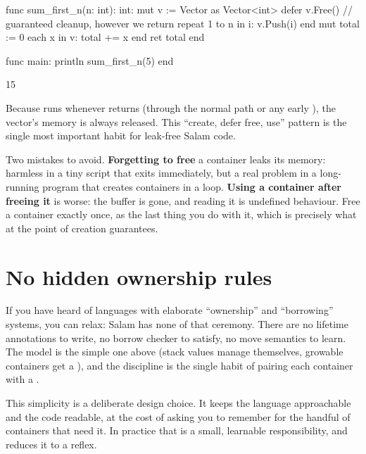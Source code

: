 \begin{salamen}
func sum_first_n(n: int): int:
    mut v := Vector {} as Vector<int>
    defer v.Free()                 // guaranteed cleanup, however we return
    repeat 1 to n in i:
        v.Push(i)
    end
    mut total := 0
    each x in v:
        total += x
    end
    ret total
end

func main:
    println sum_first_n(5)
end
\end{salamen}

\begin{progout}
15
\end{progout}

Because  runs whenever  returns (through
the normal path or any early ), the vector's memory is always released.
This ``create, defer free, use'' pattern is the single most important habit for
leak-free Salam code.

\begin{warn}
Two mistakes to avoid. \textbf{Forgetting to free} a container leaks its
memory: harmless in a tiny script that exits immediately, but a real problem in a
long-running program that creates containers in a loop. \textbf{Using a container
after freeing it} is worse: the buffer is gone, and reading it is undefined
behaviour. Free a container exactly once, as the last thing you do with it,
which is precisely what  at the point of creation guarantees.
\end{warn}

\section{No hidden ownership rules}

If you have heard of languages with elaborate ``ownership'' and ``borrowing''
systems, you can relax: Salam has none of that ceremony. There are no lifetime
annotations to write, no borrow checker to satisfy, no move semantics to learn.
The model is the simple one above (stack values manage themselves, growable
containers get a ), and the discipline is the single habit of pairing
each container with a .

This simplicity is a deliberate design choice. It keeps the language approachable
and the code readable, at the cost of asking you to remember  for the
handful of containers that need it. In practice that is a small, learnable
responsibility, and  reduces it to a reflex.

